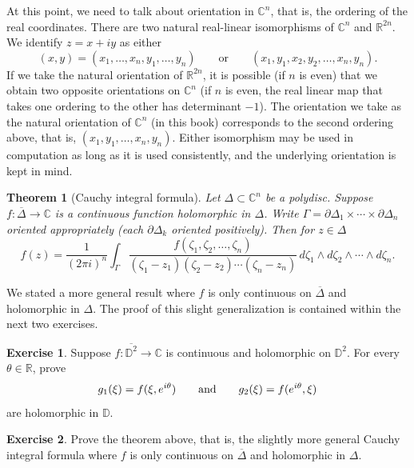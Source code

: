 \documentclass[12pt,openany]{book}
\newcommand{\avoidbreak}{\postdisplaypenalty=100}
\newcommand{\C}{{\mathbb{C}}}
\newcommand{\R}{{\mathbb{R}}}
\newcommand{\D}{{\mathbb{D}}}
\theoremstyle{plain}
\newtheorem{thm}{Theorem}[section]
\theoremstyle{remark}
\theoremstyle{definition}
\newenvironment{exbox}{%
    \def\FrameCommand{\vrule width 1pt \relax\hspace{10pt}}%
    \MakeFramed{\advance\hsize-\width\FrameRestore}%
}{%
    \endMakeFramed
}
\theoremstyle{exercise}
\newtheorem{exercise}{Exercise}[section]
\theoremstyle{example}
\begin{document}
At this point, we need to talk about orientation in $\C^n$, that is,
the ordering of the real coordinates.  There are two
natural real-linear isomorphisms of $\C^n$ and $\R^{2n}$.  We
identify $z = x+iy$ as either
\begin{equation*}
(x,y) = (x_1,\ldots,x_n,y_1,\ldots,y_n) \qquad
\text{or} \qquad
(x_1,y_1,x_2,y_2,\ldots,x_n,y_n) .
\end{equation*}
If we take the natural orientation of $\R^{2n}$,
it is possible (if $n$ is even) that we obtain
two opposite orientations on $\C^n$ (if $n$ is even, the real linear map
that takes one ordering to the other has determinant $-1$).
The orientation we take as the natural orientation of $\C^n$ (in this book)
corresponds to
the second ordering above, that
is, $(x_1,y_1,\ldots,x_n,y_n)$.  Either isomorphism may be used
in computation as long as it is used consistently, and the underlying
orientation is kept in mind.

\begin{thm}[Cauchy integral formula]
Let $\Delta \subset \C^n$ be a polydisc.
Suppose
$f \colon \overline{\Delta} \to \C$ is a continuous function
holomorphic in $\Delta$.
Write $\Gamma = \partial \Delta_1 \times \cdots \times \partial \Delta_n$
oriented appropriately (each $\partial \Delta_k$ oriented positively).
Then for $z \in \Delta$
\begin{equation*}
f(z) =
\frac{1}{{(2\pi i)}^n}
\int_{\Gamma}
\frac{f(\zeta_1,\zeta_2,\ldots,\zeta_n)}{(\zeta_1-z_1)(\zeta_2-z_2)\cdots(\zeta_n-z_n)}
\,
d \zeta_1
\wedge
d \zeta_2
\wedge
\cdots
\wedge
d \zeta_n .
\end{equation*}
\end{thm}

We stated a more general result where $f$ is only continuous
on $\overline{\Delta}$ and holomorphic in $\Delta$.  The proof of this
slight generalization is contained within the next two exercises.

\begin{exbox}
\begin{exercise}
Suppose $f \colon \overline{\D^2} \to \C$ is continuous and holomorphic
on $\D^2$.  For every $\theta \in \R$, prove
\begin{equation*}
g_1(\xi) = f(\xi,e^{i\theta}) \qquad \text{and} \qquad
g_2(\xi) = f(e^{i\theta},\xi)
\avoidbreak
\end{equation*}
are holomorphic in $\D$.
\end{exercise}

\begin{exercise}
Prove the theorem above, that is, the slightly more general Cauchy integral
formula where $f$ is only continuous on $\overline{\Delta}$ and
holomorphic in $\Delta$.
\end{exercise}
\end{exbox}
\end{document}

